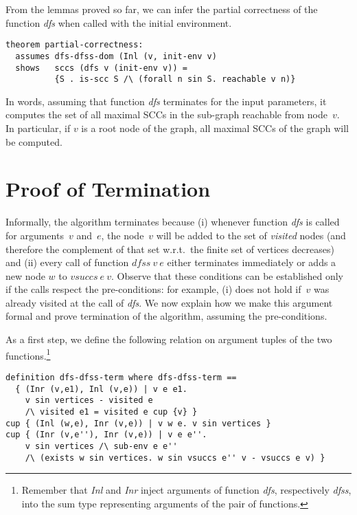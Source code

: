 \documentclass[sigplan,10pt,anonymous,review]{acmart}
\newcommand{\prog}[1]{\textit{#1}}
\begin{document}
From the lemmas proved so far, we can infer the partial correctness of the function \prog{dfs} when called with the initial environment.

\begin{small}
\begin{lstlisting}[language=isabelle]
theorem partial-correctness:
  assumes dfs-dfss-dom (Inl (v, init-env v)
  shows   sccs (dfs v (init-env v)) = 
          {S . is-scc S /\ (forall n sin S. reachable v n)}
\end{lstlisting}
\end{small}

In words, assuming that function \prog{dfs} terminates for the input parameters, it computes the set of all maximal SCCs in the sub-graph reachable from node~$v$. In particular, if $v$ is a root node of the graph, all maximal SCCs of the graph will be computed.



\section{Proof of Termination}
\label{sec:termination}

Informally, the algorithm terminates because (i) whenever function \prog{dfs} is called for arguments~$v$ and~$e$, the node~$v$ will be added to the set of \prog{visited} nodes (and therefore the complement of that set w.r.t.\ the finite set of vertices decreases) and (ii) every call of function $\prog{dfss}~v~e$ either terminates immediately or adds a new node $w$ to $\prog{vsuccs}~e~v$. Observe that these conditions can be established only if the calls respect the pre-conditions: for example, (i) does not hold if~$v$ was already visited at the call of \prog{dfs}. We now explain how we make this argument formal and prove termination of the algorithm, assuming the pre-conditions.

As a first step, we define the following relation on argument tuples of the two functions.\footnote{Remember that \prog{Inl} and \prog{Inr} inject arguments of function \prog{dfs}, respectively \prog{dfss}, into the sum type representing arguments of the pair of functions.}

\begin{small}
\begin{lstlisting}[language=isabelle]
definition dfs-dfss-term where dfs-dfss-term ==
  { (Inr (v,e1), Inl (v,e)) | v e e1.
    v sin vertices - visited e 
    /\ visited e1 = visited e cup {v} }
cup { (Inl (w,e), Inr (v,e)) | v w e. v sin vertices }
cup { (Inr (v,e''), Inr (v,e)) | v e e''.
    v sin vertices /\ sub-env e e''
    /\ (exists w sin vertices. w sin vsuccs e'' v - vsuccs e v) }
\end{lstlisting}
\end{small}
\end{document}
